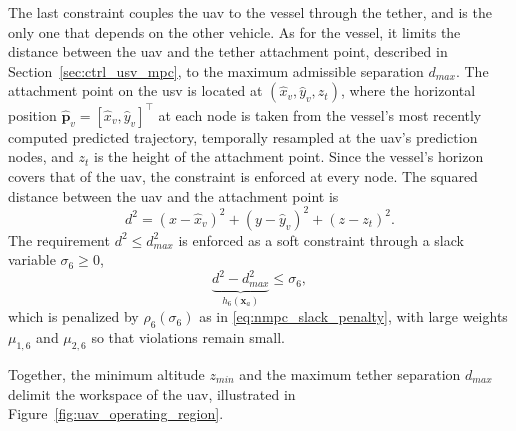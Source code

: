 The last constraint couples the \gls{uav} to the vessel through the tether, and is the only one that depends on the other vehicle. As for the vessel, it limits the distance between the \gls{uav} and the tether attachment point, described in Section~\ref{sec:ctrl_usv_mpc}, to the maximum admissible separation $d_{max}$. The attachment point on the \gls{usv} is located at $(\hat x_v, \hat y_v, z_t)$, where the horizontal position $\hat{\mathbf{p}}_v = [\hat x_v, \hat y_v]^\top$ at each node is taken from the vessel's most recently computed predicted trajectory, temporally resampled at the \gls{uav}'s prediction nodes, and $z_t$ is the height of the attachment point. Since the vessel's horizon covers that of the \gls{uav}, the constraint is enforced at every node. The squared distance between the \gls{uav} and the attachment point is
\begin{equation}
    d^2 = (x-\hat x_v)^2 + (y-\hat y_v)^2 + (z-z_t)^2.
    \label{eq:uav_mpc_tether_distance}
\end{equation}
The requirement $d^2 \le d_{max}^2$ is enforced as a soft constraint through a slack variable $\sigma_6 \ge 0$,
\begin{equation}
    \underbrace{d^2 - d_{max}^2}_{h_6(\mathbf{x}_a)} \le \sigma_6,
    \label{eq:uav_mpc_tether_constraint}
\end{equation}
which is penalized by $\rho_6(\sigma_6)$ as in \eqref{eq:nmpc_slack_penalty}, with large weights $\mu_{1,6}$ and $\mu_{2,6}$ so that violations remain small.

Together, the minimum altitude $z_{min}$ and the maximum tether separation $d_{max}$ delimit the workspace of the \gls{uav}, illustrated in Figure~\ref{fig:uav_operating_region}.

